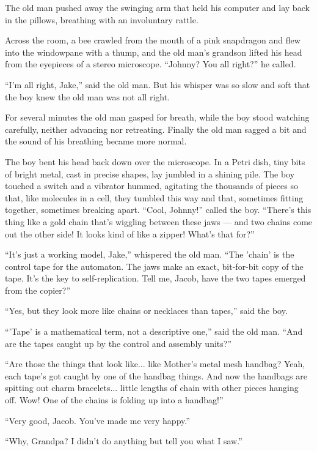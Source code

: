 \documentclass[english,11pt,letterpaper,onecolumn]{scrbook}
\begin{document}
	The old man pushed away the swinging arm that held his computer and lay back in the pillows, breathing with an involuntary rattle.

	Across the room, a bee crawled from the mouth of a pink snapdragon and flew into the windowpane with a thump, and the old man's grandson lifted his head from the eyepieces of a stereo microscope.  ``Johnny?  You all right?'' he called.

	``I'm all right, Jake,'' said the old man.  But his whisper was so slow and soft that the boy knew the old man was not all right.

	For several minutes the old man gasped for breath, while the boy stood watching carefully, neither advancing nor retreating.  Finally the old man sagged a bit and the sound of his breathing became more normal.

	The boy bent his head back down over the microscope.  In a Petri dish, tiny bits of bright metal, cast in precise shapes, lay jumbled in a shining pile.  The boy touched a switch and a vibrator hummed, agitating the thousands of pieces so that, like molecules in a cell, they tumbled this way and that, sometimes fitting together, sometimes breaking apart.  ``Cool, Johnny!'' called the boy.  ``There's this thing like a gold chain that's wiggling between these jaws --- and two chains come out the other side!  It looks kind of like a zipper!  What's that for?''

	``It's just a working model, Jake,'' whispered the old man.  ``The 'chain' is the control tape for the automaton.  The jaws make an exact, bit-for-bit copy of the tape.  It's the key to self-replication.  Tell me, Jacob, have the two tapes emerged from the copier?''

	``Yes, but they look more like chains or necklaces than tapes,'' said the boy.

	``'Tape' is a mathematical term, not a descriptive one,'' said the old man.  ``And are the tapes caught up by the control and assembly units?''

	``Are those the things that look like... like Mother's metal mesh handbag?  Yeah, each tape's got caught by one of the handbag things.  And now the handbags are spitting out charm bracelets... little lengths of chain with other pieces hanging off.  Wow!  One of the chains is folding up into a handbag!''

	``Very good, Jacob.  You've made me very happy.''

	``Why, Grandpa?  I didn't do anything but tell you what I saw.''
\end{document}
